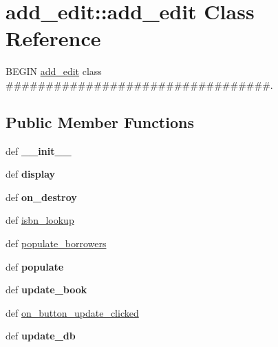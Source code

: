 \hypertarget{classadd__edit_1_1add__edit}{
\section{add\_\-edit::add\_\-edit Class Reference}
\label{classadd__edit_1_1add__edit}
}


BEGIN \hyperlink{classadd__edit_1_1add__edit}{add\_\-edit} class \#\#\#\#\#\#\#\#\#\#\#\#\#\#\#\#\#\#\#\#\#\#\#\#\#\#\#\#\#\#\#\#\#.  


\subsection*{Public Member Functions}
\begin{DoxyCompactItemize}
\item 
\hypertarget{classadd__edit_1_1add__edit_af4a994f883cc9f1d4ce4755151a018fd}{
def {\bfseries \_\-\_\-init\_\-\_\-}}
\label{classadd__edit_1_1add__edit_af4a994f883cc9f1d4ce4755151a018fd}

\item 
\hypertarget{classadd__edit_1_1add__edit_a472de34bd215c34a8f035ae27432c42f}{
def {\bfseries display}}
\label{classadd__edit_1_1add__edit_a472de34bd215c34a8f035ae27432c42f}

\item 
\hypertarget{classadd__edit_1_1add__edit_a4e3c02b02b3f70cec786d5eee518b4d2}{
def {\bfseries on\_\-destroy}}
\label{classadd__edit_1_1add__edit_a4e3c02b02b3f70cec786d5eee518b4d2}

\item 
def \hyperlink{classadd__edit_1_1add__edit_a36b4710ceb597d80d0195c02e96decea}{isbn\_\-lookup}
\item 
def \hyperlink{classadd__edit_1_1add__edit_add93cbdf25b5aaad4d36f0de5df8d0b3}{populate\_\-borrowers}
\item 
\hypertarget{classadd__edit_1_1add__edit_a14e2bc151bf934a573f37dcc538ce94d}{
def {\bfseries populate}}
\label{classadd__edit_1_1add__edit_a14e2bc151bf934a573f37dcc538ce94d}

\item 
\hypertarget{classadd__edit_1_1add__edit_a81984199dbe0f6982544447433e3339d}{
def {\bfseries update\_\-book}}
\label{classadd__edit_1_1add__edit_a81984199dbe0f6982544447433e3339d}

\item 
def \hyperlink{classadd__edit_1_1add__edit_af302d7391d5c263de730b65dc39f7dd8}{on\_\-button\_\-update\_\-clicked}
\item 
\hypertarget{classadd__edit_1_1add__edit_a553121851a6735abee974f216eaaa69b}{
def {\bfseries update\_\-db}}
\label{classadd__edit_1_1add__edit_a553121851a6735abee974f216eaaa69b}


\end{DoxyCompactItemize}
